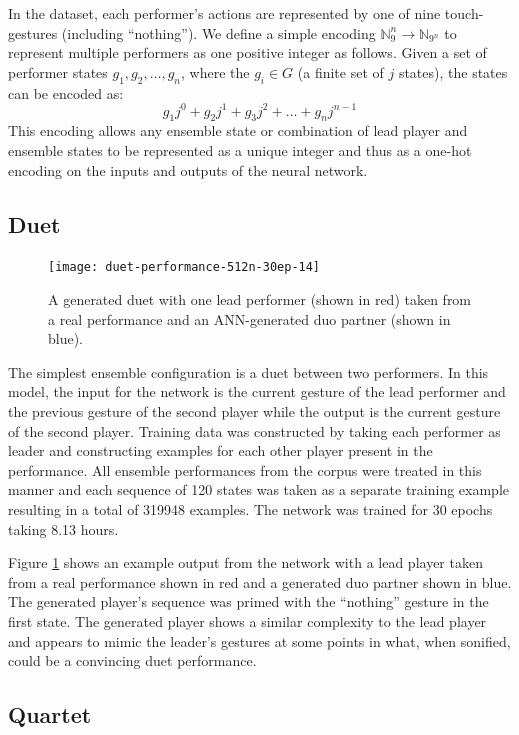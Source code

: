 \documentclass{article}
\begin{document}
In the dataset, each performer's actions are represented by one of
nine touch-gestures (including ``nothing''). We define a simple
encoding $\mathbb{N}_{9}^n \rightarrow \mathbb{N}_{9^n}$ to
represent multiple performers as one positive integer as follows.
Given a set of performer states $g_1, g_2, \ldots, g_n$, where the
$g_i \in G$ (a finite set of $j$ states), the states can be
encoded as:
\begin{equation}
g_1j^0 + g_2j^1 + g_3j^2 + \ldots + g_nj^{n-1}
\end{equation}
This encoding allows any ensemble state or combination of lead player
and ensemble states to be represented as a unique integer and thus as
a one-hot encoding on the inputs and outputs of the neural network.

\subsection{Duet}

\begin{figure}
  \centering
  \texttt{[image: duet-performance-512n-30ep-14]}
  \caption{A generated duet with one lead performer (shown in red)
    taken from a real performance and an ANN-generated duo partner
    (shown in blue).}\label{fig:duo-model}
\end{figure}

The simplest ensemble configuration is a duet between two performers.
In this model, the input for the network is the current gesture of the
lead performer and the previous gesture of the second player while the
output is the current gesture of the second player. Training data was
constructed by taking each performer as leader and constructing
examples for each other player present in the performance. All
ensemble performances from the corpus were treated in this manner and
each sequence of 120 states was taken as a separate training example
resulting in a total of 319948 examples. The network was trained for
30 epochs taking 8.13 hours.

Figure \ref{fig:duo-model} shows an example output from the network
with a lead player taken from a real performance shown in red and a
generated duo partner shown in blue. The generated player's sequence
was primed with the ``nothing'' gesture in the first state. The
generated player shows a similar complexity to the lead player and
appears to mimic the leader's gestures at some points in what, when
sonified, could be a convincing duet performance.

\subsection{Quartet}
\end{document}
